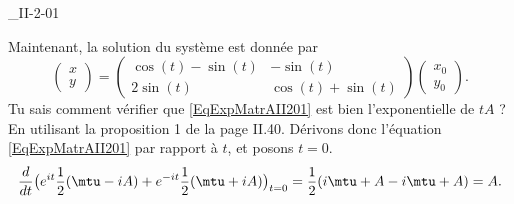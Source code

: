 \begin{corrige}{_II-2-01}
\begin{enumerate}
\begin{alternative}
Maintenant, la solution du système est donnée par
\begin{equation}
	\begin{pmatrix}
	x	\\ 
	y	
\end{pmatrix}=
\begin{pmatrix}
	\cos(t)-\sin(t)	&	-\sin(t)	\\ 
	2\sin(t)	&	\cos(t)+\sin(t)	
\end{pmatrix}\begin{pmatrix}
	x_0	\\ 
	y_0	
\end{pmatrix}.
\end{equation}
Tu sais comment vérifier que \eqref{EqExpMatrAII201} est bien l'exponentielle de $tA$ ? En utilisant la proposition 1 de la page II.40. Dérivons donc l'équation \eqref{EqExpMatrAII201} par rapport à $t$, et posons $t=0$.
\begin{equation}
	\frac{ d }{ dt }\big(  e^{it}\frac{ 1 }{2}(\mtu-iA)+ e^{-it}\frac{1}{ 2 }(\mtu+iA) \big)_{t=0}=\frac{ 1 }{2}(i\mtu+A-i\mtu+A)=A.
\end{equation}

\end{alternative}



\end{enumerate}
\end{corrige}
